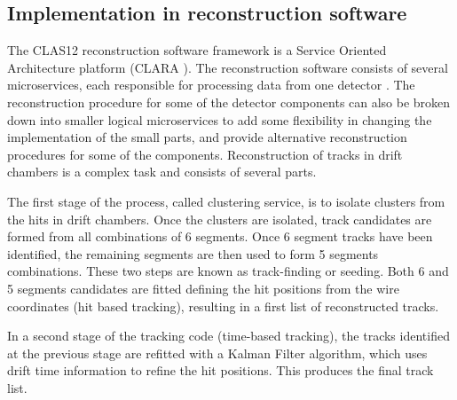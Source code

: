\subsection{Implementation in reconstruction software}

The CLAS12 reconstruction software framework is a Service Oriented Architecture platform (CLARA \cite{Gyurjyan:2011zz}).
The reconstruction software consists of several microservices, each responsible for processing data from one
detector \cite{Ziegler:2020gsr}. The reconstruction procedure for some of the detector components can also 
be broken down into smaller logical microservices to add some flexibility in changing the implementation of the small parts, 
and provide alternative reconstruction procedures for some of the components.
Reconstruction of tracks in drift chambers is a complex task and consists of several parts.

The first stage of the process, called clustering service, is to isolate clusters
from the hits in drift chambers. Once the clusters are isolated, track candidates are formed from all combinations 
of 6 segments. Once 6 segment tracks have been identified, the remaining segments are then used to form 5 segments combinations. These two steps are known as track-finding or seeding.
Both 6 and 5 segments candidates are fitted defining the hit positions from the wire coordinates (hit based tracking), resulting in a first list of reconstructed tracks.

In a second stage of the tracking code (time-based tracking), 
the tracks identified at the previous stage are refitted with a Kalman Filter algorithm, which uses drift time information to refine the hit positions.
This produces the final track list.

